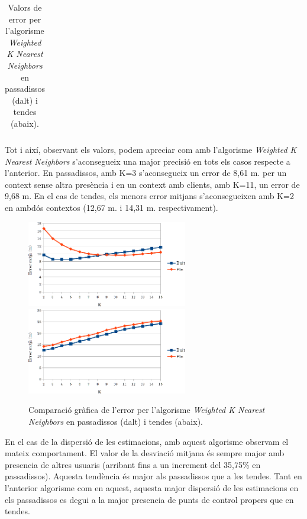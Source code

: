 \begin{table}[h]
\begin{center}
\begin{tabular}{|l|c|c|c|}
      \end{tabular}
 \end{center}
      
\caption{Valors de error per l'algorisme \textit{Weighted K Nearest Neighbors} en passadissos (dalt) i tendes (abaix).}
\label{tab:error_WKNN}
\end{table}

Tot i així, observant els valors, podem apreciar com amb l'algorisme \textit{Weighted K Nearest Neighbors} s'aconsegueix una major precisió en tots els casos respecte a l'anterior. En passadissos, amb K=3 s'aconsegueix un error de 8,61 m. per un context sense altra presència i en un context amb clients, amb K=11, un error de 9,68 m. En el cas de tendes, els menors error mitjans s'aconsegueixen amb K=2 en ambdós contextos (12,67 m. i 14,31 m. respectivament).

\begin{figure}[ht]
\begin{center}
\includegraphics[width=7cm]{imatges/wknn_passadis.png}
\includegraphics[width=7cm]{imatges/wknn_tenda.png}
\caption{Comparació gràfica de l'error per l'algorisme \textit{Weighted K Nearest Neighbors} en passadissos (dalt) i tendes (abaix).}
\label{fig:grafic_WKNN}
\end{center}
\end{figure}

En el cas de la dispersió de les estimacions, amb aquest algorisme observam el mateix comportament. El valor de la desviació mitjana és sempre major amb presencia de altres usuaris (arribant fins a un increment del 35,75\% en passadissos). Aquesta tendència és major als passadissos que a les tendes. Tant en l'anterior algorisme com en aquest, aquesta major dispersió de les estimacions en els passadissos es degui a la major presencia de punts de control propers que en tendes.

